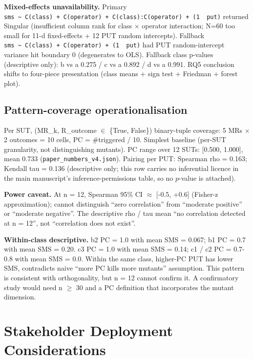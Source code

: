 \documentclass[manuscript,screen,review]{acmart}
\begin{document}
\textbf{Mixed-effects unavailability.} Primary
\texttt{sms\ \textasciitilde{}\ C(class)\ +\ C(operator)\ +\ C(class):C(operator)\ +\ (1\ \textbar{}\ put)}
returned Singular (insufficient column rank for class $\times$ operator
interaction; N=60 too small for 11-d fixed-effects + 12 PUT random
intercepts). Fallback
\texttt{sms\ \textasciitilde{}\ C(class)\ +\ C(operator)\ +\ (1\ \textbar{}\ put)}
had PUT random-intercept variance hit boundary 0 (degenerates to OLS).
Fallback class p-values (descriptive only): b vs a 0.275 / c vs a 0.892
/ d vs a 0.991. RQ5 conclusion shifts to four-piece presentation (class
means + sign test + Friedman + forest plot).

\subsection{Pattern-coverage operationalisation}\label{d.5-pattern-coverage-operationalisation}

Per SUT, (MR\_k, R\_outcome $\in$ \{True, False\}) binary-tuple coverage: 5
MRs $\times$ 2 outcomes = 10 cells, PC = \#triggered / 10. Simplest baseline
(per-SUT granularity, not distinguishing mutants). PC range over 12
SUTs: {[}0.500, 1.000{]}, mean 0.733 (\texttt{paper\_numbers\_v4.json}).
Pairing per PUT: Spearman rho = 0.163; Kendall tau = 0.136 (descriptive
only; this row carries no inferential licence in the main manuscript's
inference-permissions table, so no $p$-value is attached).

\textbf{Power caveat.} At n = 12, Spearman 95\% CI $\approx$ {[}-0.5, +0.6{]}
(Fisher-z approximation); cannot distinguish ``zero correlation'' from ``moderate positive'' or
``moderate negative''. The descriptive rho / tau mean ``no correlation detected
at n = 12'', not ``correlation does not exist''.

\textbf{Within-class descriptive.} b2 PC = 1.0 with mean SMS = 0.067; b1
PC = 0.7 with mean SMS = 0.20. c3 PC = 1.0 with mean SMS = 0.14; c1 / c2
PC = 0.7-0.8 with mean SMS = 0.0. Within the same class, higher-PC PUT
has lower SMS, contradicts naive ``more PC kills more mutants''
assumption. This pattern is consistent with orthogonality, but n = 12
cannot confirm it. A confirmatory study would need n $\geq$ 30 and a PC
definition that incorporates the mutant dimension.


\section{Stakeholder Deployment Considerations}\label{e.-stakeholder-deployment-considerations-single-output-kernels-scope}
\end{document}
